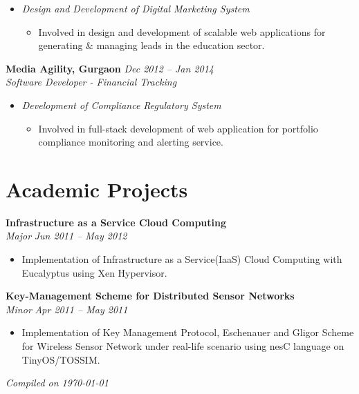 \documentclass[margin,line]{resume}
\begin{document}
\begin{resume}
\begin{itemize}
     \item \textsl{Design and Development of Digital Marketing System}
        \begin{itemize}
            \item Involved in design and development of scalable web applications for generating \& managing leads
            in the education sector.
        \end{itemize}
   \end{itemize}

\textbf{Media Agility, Gurgaon}   \hfill \textsl{Dec 2012 -- Jan 2014} \vspace{0mm}\\\vspace{0mm}%
           \textsl{Software Developer - Financial Tracking}\\
    \begin{itemize}
    
     \item \textsl{Development of Compliance Regulatory System} 
        \begin{itemize}
            \item Involved in full-stack development of web application for portfolio compliance monitoring and alerting service.
        \end{itemize}
    
    \end{itemize}

    
    \section{\mysidestyle Academic Projects}
    \textbf{Infrastructure as a Service Cloud Computing}\vspace{0mm}\\\vspace{0mm}%
    \textsl{Major} \hfill \textsl{Jun 2011 -- May 2012}
       \begin{itemize} 
	        \item Implementation of Infrastructure as a Service(IaaS) Cloud Computing with Eucalyptus using Xen Hypervisor.
       \end{itemize}

    \textbf{Key-Management Scheme for Distributed Sensor Networks}\vspace{0mm}\\\vspace{0mm}%
    \textsl{Minor} \hfill \textsl{Apr 2011 -- May 2011}
       \begin{itemize} 
            \item Implementation of Key Management Protocol, Eschenauer and Gligor Scheme for Wireless Sensor Network under real-life scenario using nesC language on TinyOS/TOSSIM.
       \end{itemize}
\hfill \textsl{Compiled on \monthyeardate\today}

\end{resume}
\end{document}
